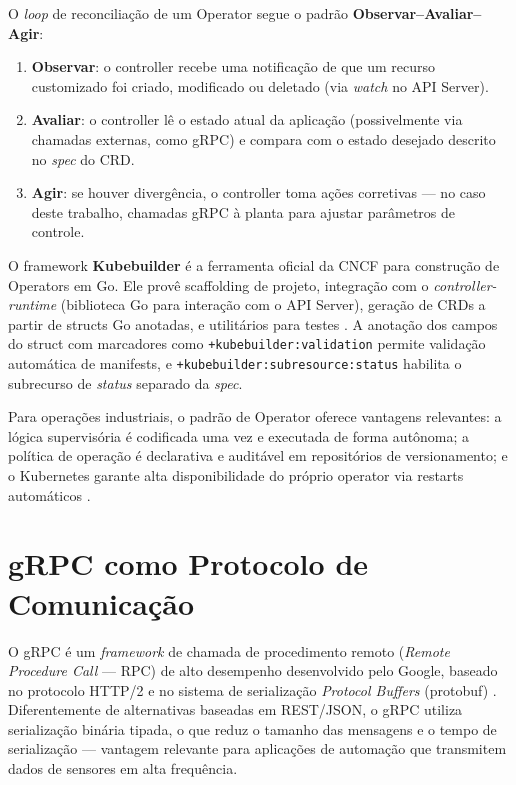 O \textit{loop} de reconciliação de um Operator segue o padrão \textbf{Observar–Avaliar–Agir}:
\begin{enumerate}
  \item \textbf{Observar}: o controller recebe uma notificação de que um recurso customizado foi criado, modificado ou deletado (via \textit{watch} no API Server).
  \item \textbf{Avaliar}: o controller lê o estado atual da aplicação (possivelmente via chamadas externas, como gRPC) e compara com o estado desejado descrito no \textit{spec} do CRD.
  \item \textbf{Agir}: se houver divergência, o controller toma ações corretivas — no caso deste trabalho, chamadas gRPC à planta para ajustar parâmetros de controle.
\end{enumerate}

O framework \textbf{Kubebuilder} é a ferramenta oficial da CNCF para construção de Operators em Go. Ele provê scaffolding de projeto, integração com o \textit{controller-runtime} (biblioteca Go para interação com o API Server), geração de CRDs a partir de structs Go anotadas, e utilitários para testes \cite{KUBEBUILDER2024}. A anotação dos campos do struct com marcadores como \texttt{+kubebuilder:validation} permite validação automática de manifests, e \texttt{+kubebuilder:subresource:status} habilita o subrecurso de \textit{status} separado da \textit{spec}.

Para operações industriais, o padrão de Operator oferece vantagens relevantes: a lógica supervisória é codificada uma vez e executada de forma autônoma; a política de operação é declarativa e auditável em repositórios de versionamento; e o Kubernetes garante alta disponibilidade do próprio operator via restarts automáticos \cite{CNCF2023}.

\section{gRPC como Protocolo de Comunicação}
\label{sec:grpc}

O gRPC é um \textit{framework} de chamada de procedimento remoto (\textit{Remote Procedure Call} — RPC) de alto desempenho desenvolvido pelo Google, baseado no protocolo HTTP/2 e no sistema de serialização \textit{Protocol Buffers} (protobuf) \cite{GRPC2024}. Diferentemente de alternativas baseadas em REST/JSON, o gRPC utiliza serialização binária tipada, o que reduz o tamanho das mensagens e o tempo de serialização — vantagem relevante para aplicações de automação que transmitem dados de sensores em alta frequência.

